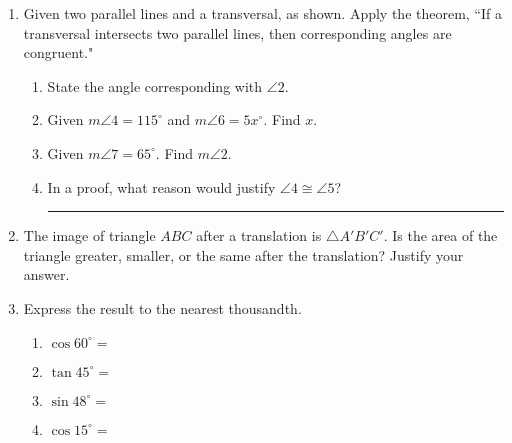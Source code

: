 \documentclass[12pt, twoside]{article}
\begin{document}
\begin{enumerate}
  \item Given two parallel lines and a transversal, as shown. Apply the theorem, ``If a transversal intersects two parallel lines, then corresponding angles are congruent."
    \begin{center}
    \end{center}
    \begin{enumerate}
      \item State the angle corresponding with $\angle 2$. \vspace{1cm}
      \item Given $m\angle 4 = 115^\circ$ and $m\angle 6 = 5x^\circ$. Find $x$. \vspace{3cm}
      \item Given $m\angle 7 = 65^\circ$. Find $m\angle 2$. \vspace{2cm}
      \item In a proof, what reason would justify $\angle 4 \cong \angle 5$? \rule{6cm}{0.15mm}
    \end{enumerate}

    \item The image of triangle $ABC$ after a translation is $\triangle A'B'C'$. Is the area of the triangle greater, smaller, or the same after the translation? Justify your answer.

\newpage

\item Express the result to the nearest thousandth.  %
  \begin{multicols}{2}
    \begin{enumerate}
      \item $\cos 60^\circ = $ \vspace{0.5cm}
      \item $\tan 45^\circ =$
      \item $\sin 48^\circ = $ \vspace{0.5cm}
      \item $\cos 15^\circ =$
    \end{enumerate}
  \end{multicols}


\end{enumerate}
\end{document}
